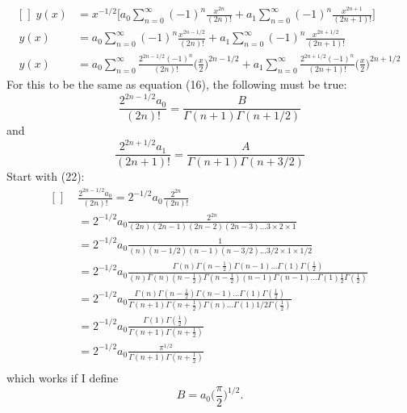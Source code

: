 \documentclass[a4paper,12pt]{article}
\begin{document}
\begin{equation*}
\begin{aligned}[\left]
y(x) &= x^{-1/2}\bigg[a_0\sum_{n=0}^{\infty}(-1)^n\frac{x^{2n}}{(2n)!} + a_1\sum_{n=0}^{\infty}(-1)^n\frac{x^{2n+1}}{(2n+1)!}\bigg]\\
y(x) &= a_0\sum_{n=0}^{\infty}(-1)^n\frac{x^{2n-1/2}}{(2n)!} + a_1\sum_{n=0}^{\infty}(-1)^n\frac{x^{2n+1/2}}{(2n+1)!}\\
y(x) &= a_0\sum_{n=0}^{\infty}\frac{2^{2n-1/2}(-1)^n}{(2n)!}\bigg(\frac{x}{2}\bigg)^{2n-1/2} + a_1\sum_{n=0}^{\infty}\frac{2^{2n+1/2}(-1)^n}{(2n+1)!}\bigg(\frac{x}{2}\bigg)^{2n+1/2}
\end{aligned}
\end{equation*}
For this to be the same as equation (16), the following must be true:
\begin{equation}
\frac{2^{2n-1/2}a_0}{(2n)!} = \frac{B}{\Gamma(n+1)\Gamma(n+1/2)}
\end{equation}
and
\begin{equation}
\frac{2^{2n+1/2}a_1}{(2n+1)!} = \frac{A}{\Gamma(n+1)\Gamma(n+3/2)}
\end{equation}
Start with (22):
\begin{equation*}
\begin{aligned}[\left]
&\frac{2^{2n-1/2}a_0}{(2n)!} = 2^{-1/2}a_0 \frac{2^{2n}}{(2n)!}\\
&= 2^{-1/2}a_0 \frac{2^{2n}}{(2n)(2n-1)(2n-2)(2n-3)...3\times 2\times 1}\\
&= 2^{-1/2}a_0 \frac{1}{(n)(n-1/2)(n-1)(n-3/2)...3/2\times 1\times 1/2}\\
&= 2^{-1/2}a_0 \frac{\Gamma(n)\Gamma(n-\frac{1}{2})\Gamma(n-1)...\Gamma(1)\Gamma(\frac{1}{2})} {(n)\Gamma(n)(n-\frac{1}{2})\Gamma(n-\frac{1}{2})(n-1)\Gamma(n-1)...\Gamma(1)\frac{1}{2}\Gamma(\frac{1}{2})}\\
&= 2^{-1/2}a_0 \frac{\Gamma(n)\Gamma(n-\frac{1}{2})\Gamma(n-1)...\Gamma(1)\Gamma(\frac{1}{2})} {\Gamma(n+1)\Gamma(n+\frac{1}{2})\Gamma(n)...\Gamma(1)1/2\Gamma(\frac{1}{2})}\\
&= 2^{-1/2}a_0 \frac{\Gamma(1)\Gamma(\frac{1}{2})} {\Gamma(n+1)\Gamma(n+\frac{1}{2})}\\
&= 2^{-1/2}a_0 \frac{\pi^{1/2}} {\Gamma(n+1)\Gamma(n+\frac{1}{2})}\\
\end{aligned}
\end{equation*}
which works if I define 
\begin{equation}
B = a_0\bigg(\frac{\pi}{2}\bigg)^{1/2}.
\end{equation}
\end{document}

